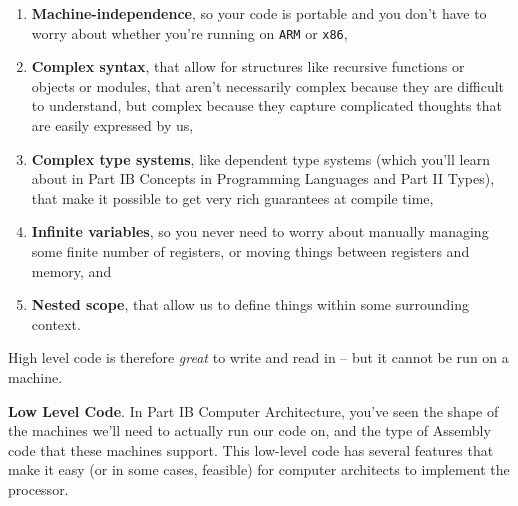 \begin{enumerate}
    \item \textbf{Machine-independence}, so your code is portable and you don't have to worry about whether you're running on \texttt{ARM} or \texttt{x86},
    \item \textbf{Complex syntax}, that allow for structures like recursive functions or objects or modules, that aren't necessarily complex because they are difficult to understand, but complex because they capture complicated thoughts that are easily expressed by us,
    \item \textbf{Complex type systems}, like dependent type systems (which you'll learn about in {\sffamily Part IB Concepts in Programming Languages} and {\sffamily Part II Types}), that make it possible to get very rich guarantees at compile time,
    \item \textbf{Infinite variables}, so you never need to worry about manually managing some finite number of registers, or moving things between registers and memory, and
    \item \textbf{Nested scope}, that allow us to define things within some surrounding context.
\end{enumerate}

High level code is therefore \emph{great} to write and read in -- but it cannot be run on a machine. 

\textbf{Low Level Code}. In {\sffamily Part IB Computer Architecture}, you've seen the shape of the machines we'll need to actually run our code on, and the type of Assembly code that these machines support. This low-level code has several features that make it easy (or in some cases, feasible) for computer architects to implement the processor.

